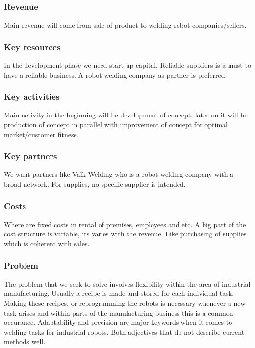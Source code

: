 \subsubsection{Revenue}
Main revenue will come from sale of product to welding robot companies/sellers.
\subsubsection{Key resources}
In the development phase we need start-up capital. Reliable suppliers is a must to have a reliable business. A robot welding company as partner is preferred. 
\subsubsection{Key activities}
Main activity in the beginning will be development of concept, later on it will be production of concept in parallel with improvement of concept for optimal market/customer fitness.
\subsubsection{Key partners}
We want partners like Valk Welding who is a robot welding company with a broad network. For supplies, no specific supplier is intended.
\subsubsection{Costs}
Where are fixed costs in rental of premises, employees and etc. A big part of the cost structure is variable, its varies with the revenue. Like purchasing of supplies which is coherent with sales. 




\subsubsection{Problem}
The problem that we seek to solve involves flexibility within the area of industrial manufacturing. Usually a recipe is made and stored for each individual task.
Making these recipes, or reprogramming the robots is necessary whenever a new task arises and within parts of the manufacturing business this is a common occurance. 
Adaptability and precision are major keywords when it comes to welding tasks for industrial robots. Both adjectives that do not describe current methods well.

